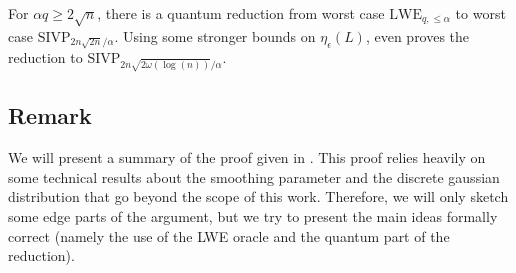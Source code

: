 \label{hardness_lwe}
For $\alpha q \geq 2\sqrt{n}$, there is a quantum reduction from worst case $\mathrm{LWE}_{q, \leq \alpha}$ to worst case $\mathrm{SIVP}_{2n\sqrt{2n}/\alpha}$. Using some stronger bounds on $\eta_\epsilon(L)$, \cite{Reg} even proves the reduction to  $\mathrm{SIVP}_{2n\sqrt{2\omega(\log(n))}/\alpha}$.

\subsection{Remark}
We will present a summary of the proof given in \cite{Reg}. This proof relies heavily on some technical results about the smoothing parameter and the discrete gaussian distribution that go beyond the scope of this work. Therefore, we will only sketch some edge parts of the argument, but we try to present the main ideas formally correct (namely the use of the LWE oracle and the quantum part of the reduction).

